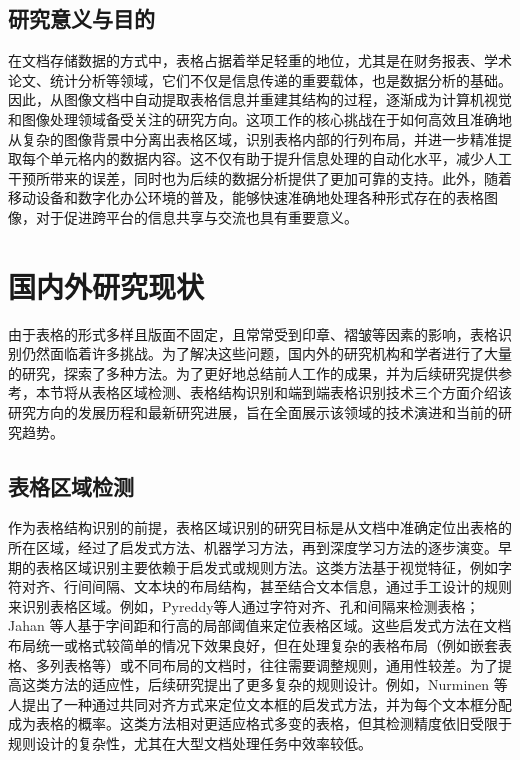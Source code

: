 \documentclass[UTF8,12pt, AutoFakeBold,fontset = founder]{ctexart}
\begin{document}
\subsection{研究意义与目的}

在文档存储数据的方式中，表格占据着举足轻重的地位，尤其是在财务报表、学术论文、统计分析等领域，它们不仅是信息传递的重要载体，也是数据分析的基础。因此，从图像文档中自动提取表格信息并重建其结构的过程，逐渐成为计算机视觉和图像处理领域备受关注的研究方向。这项工作的核心挑战在于如何高效且准确地从复杂的图像背景中分离出表格区域，识别表格内部的行列布局，并进一步精准提取每个单元格内的数据内容。这不仅有助于提升信息处理的自动化水平，减少人工干预所带来的误差，同时也为后续的数据分析提供了更加可靠的支持。此外，随着移动设备和数字化办公环境的普及，能够快速准确地处理各种形式存在的表格图像，对于促进跨平台的信息共享与交流也具有重要意义。

\section{国内外研究现状}

由于表格的形式多样且版面不固定，且常常受到印章、褶皱等因素的影响，表格识别仍然面临着许多挑战。为了解决这些问题，国内外的研究机构和学者进行了大量的研究，探索了多种方法。为了更好地总结前人工作的成果，并为后续研究提供参考，本节将从表格区域检测、表格结构识别和端到端表格识别技术三个方面介绍该研究方向的发展历程和最新研究进展，旨在全面展示该领域的技术演进和当前的研究趋势。

\subsection{表格区域检测}

作为表格结构识别的前提，表格区域识别的研究目标是从文档中准确定位出表格的所在区域，经过了启发式方法、机器学习方法，再到深度学习方法的逐步演变。早期的表格区域识别主要依赖于启发式或规则方法。这类方法基于视觉特征，例如字符对齐、行间间隔、文本块的布局结构，甚至结合文本信息，通过手工设计的规则来识别表格区域。例如，Pyreddy\cite{b1}等人通过字符对齐、孔和间隔来检测表格；Jahan 等人基于字间距和行高的局部阈值来定位表格区域。这些启发式方法在文档布局统一或格式较简单的情况下效果良好，但在处理复杂的表格布局（例如嵌套表格、多列表格等）或不同布局的文档时，往往需要调整规则，通用性较差。为了提高这类方法的适应性，后续研究提出了更多复杂的规则设计。例如，Nurminen 等人提出了一种通过共同对齐方式来定位文本框的启发式方法，并为每个文本框分配成为表格的概率。这类方法相对更适应格式多变的表格，但其检测精度依旧受限于规则设计的复杂性，尤其在大型文档处理任务中效率较低。
\end{document}
